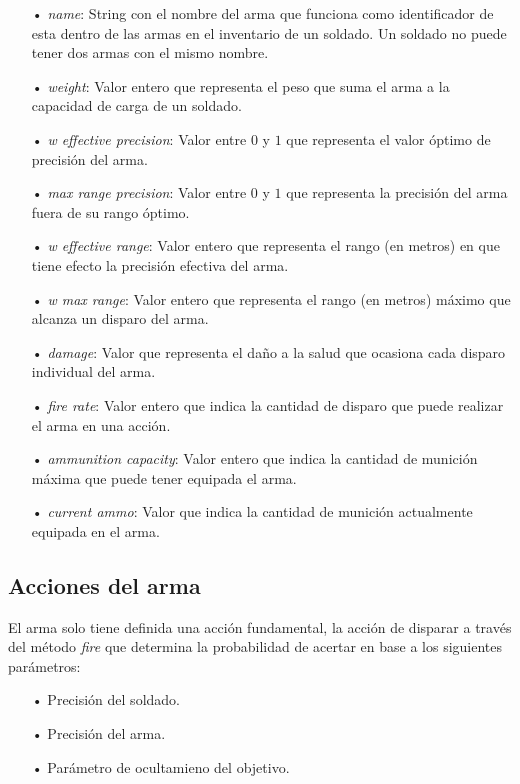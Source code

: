 \documentclass[twoside]{article}
\begin{document}
\begin{itemize}
	\item[•] \emph{name}: String con el nombre del arma que funciona como identificador de esta dentro de las armas en el inventario de un soldado. Un soldado no puede tener dos armas con el mismo nombre.
	\item[•] \emph{weight}: Valor entero que representa el peso que suma el arma a la capacidad de carga de un soldado.
	\item[•] \emph{w effective precision}: Valor entre $0$ y $1$ que representa el valor \'optimo de precisi\'on del arma.
	\item[•] \emph{max range precision}: Valor entre $0$ y $1$ que representa la precisi\'on del arma fuera de su rango \'optimo.
	\item[•] \emph{w effective range}: Valor entero que representa el rango (en metros) en que tiene efecto la precisi\'on efectiva del arma.
	\item[•] \emph{w max range}: Valor entero que representa el rango (en metros) m\'aximo que alcanza un disparo del arma.
	\item[•] \emph{damage}: Valor que representa el da\~no a la salud que ocasiona cada disparo individual del arma.
	\item[•] \emph{fire rate}: Valor entero que indica la cantidad de disparo que puede realizar el arma en una acci\'on.
	\item[•] \emph{ammunition capacity}: Valor entero que indica la cantidad de munici\'on m\'axima que puede tener equipada el arma.
	\item[•] \emph{current ammo}: Valor que indica la cantidad de munici\'on actualmente equipada en el arma.
	
\end{itemize}


\subsection{Acciones del arma}

El arma solo tiene definida una acci\'on fundamental, la acci\'on de disparar a trav\'es del m\'etodo \emph{fire} que determina la probabilidad de acertar en base a los siguientes par\'ametros:

\begin{itemize}
	\item[•] Precisi\'on del soldado.
	\item[•] Precisi\'on del arma.
	\item[•] Par\'ametro de ocultamieno del objetivo.
\end{itemize}
\end{document}
